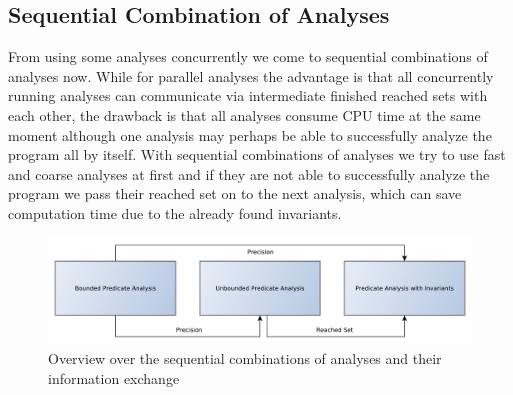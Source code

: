 \subsection{Sequential Combination of Analyses}
From using some analyses concurrently we come to sequential combinations of analyses now. While for parallel analyses the advantage is that all concurrently running analyses can communicate via
intermediate finished reached sets with each other, the drawback is that all analyses consume CPU time at the same moment although one analysis may perhaps be able to successfully analyze the program
all by itself. With sequential combinations of analyses we try to use fast and coarse analyses at first and if they are not able to successfully analyze the program we pass their reached set on to the
next analysis, which can save computation time due to the already found invariants.

\begin{figure}
 \includegraphics[width=\textwidth]{../graphics/sequential_invgen}
 \caption{Overview over the sequential combinations of analyses and their information exchange}
 \label{fig:sequentialOverview}
\end{figure}


